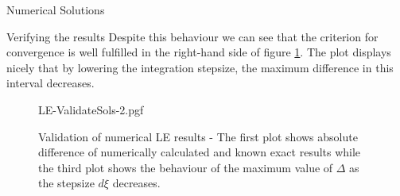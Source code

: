 \begin{section}{Numerical Solutions}
\begin{subsection}{Verifying the results}
Despite this behaviour we can see that the criterion for convergence is well fulfilled in the right-hand side of figure \ref{4-NumSol-Plt-ValidateLEResults}.
The plot displays nicely that by lowering the integration stepsize, the maximum difference in this interval decreases.
\begin{figure}[H]
	\centering
	{LE-ValidateSols-2.pgf}
	\caption[Validation of numerical LE results]{Validation of numerical \ac{LE} results - The first plot shows absolute difference of numerically calculated and known exact results while the third plot shows the behaviour of the maximum value of $\Delta$ as the stepsize $d\xi$ decreases.}
	\label{4-NumSol-Plt-ValidateLEResults}
\end{figure}\noindent

\end{subsection}
\end{section}
